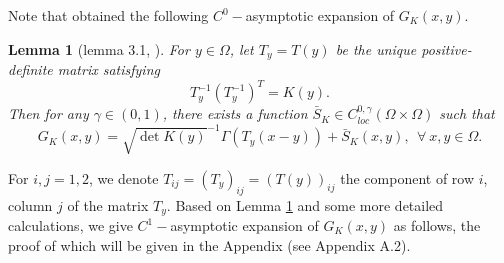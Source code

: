 \documentclass[12pt,reqno]{amsart}
\numberwithin{equation}{section}
\newtheorem{lemma}[theorem]{Lemma}
\theoremstyle{definition}
\theoremstyle{remark}
\begin{document}
  Note that \cite{CW,CW1}  obtained the following $ C^0-$asymptotic expansion of $ G_K(x,y)$. %
\begin{lemma}[lemma 3.1, \cite{CW}]\label{Green expansion}
For $ y\in\Omega $, let $ T_y=T(y) $ be the unique positive-definite matrix satisfying
$$ T_y^{-1}(T_y^{-1})^{T}=K(y). $$ 
Then for any $ \gamma\in(0,1) $, there exists a function $\bar{S}_K\in C^{0,\gamma}_{loc} (\Omega\times \Omega) $ such that
\begin{equation*}
G_K(x,y)=\sqrt{\det K(y)}^{-1}\Gamma\left (T_y(x-y)\right )+\bar{S}_K(x,y),\ \ \forall\ x,y\in\Omega.
\end{equation*}
\end{lemma}
For $ i,j=1,2 $, we denote $ T_{ij}=(T_y)_{ij}=(T(y))_{ij} $ the component of row $ i $, column $ j $ of the matrix $ T_y $. Based on Lemma \ref{Green expansion} and some more detailed calculations, we give $ C^1- $asymptotic expansion of $ G_K(x,y) $ as follows, the proof of which will be given in the Appendix (see Appendix A.2). %
\end{document}
